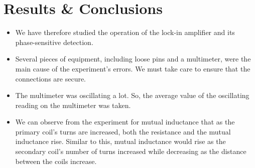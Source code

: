\section{Results \& Conclusions}

	\begin{itemize}
		\item We have therefore studied the operation of the lock-in amplifier and its phase-sensitive detection.
		\item Several pieces of equipment, including loose pins and a multimeter, were the main cause of the experiment's errors. We must take care to ensure that the connections are secure.
		\item The multimeter was oscillating a lot. So, the average value of the oscillating reading on the multimeter was taken.
		\item We can observe from the experiment for mutual inductance that as the primary coil's turns are increased, both the resistance and the mutual inductance rise. Similar to this, mutual inductance would rise as the secondary coil's number of turns increased while decreasing as the distance between the coils increase.
	\end{itemize}

